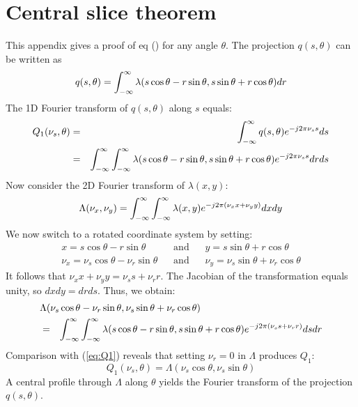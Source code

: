 \section{Central slice theorem \label{app:cs}}
This appendix gives a proof of eq () for any angle
$\theta$. The projection $q(s,\theta)$ can be written as
\begin{equation}
  q(s, \theta) = \int_{-\infty}^{\infty} \lambda(s \cos\theta - r\sin\theta, 
                                s \sin\theta + r\cos\theta) dr
\end{equation}
The 1D Fourier transform of $q(s,\theta)$ along $s$ equals:
\begin{eqnarray}
  Q_1(\nu_s, \theta) &=& \int_{-\infty}^{\infty} q(s, \theta) e^{-j2\pi \nu_s s} ds 
    \nonumber\\
  &=& \int_{-\infty}^{\infty}\int_{-\infty}^{\infty}\lambda(s\cos\theta - r\sin\theta, 
                          s\sin\theta + r\cos\theta)e^{-j2\pi \nu_s s} dr ds
      \label{eq:Q1}
\end{eqnarray}
Now consider the 2D Fourier transform of $\lambda(x,y)$:
\begin{equation}
  \Lambda(\nu_x, \nu_y) = \int_{-\infty}^{\infty} \int_{-\infty}^{\infty} \lambda(x,y) 
       e^{-j2\pi (\nu_x x + \nu_y y)} dx dy
\end{equation}
We now switch to a rotated coordinate system by setting:
\begin{eqnarray}
   x = s \cos\theta - r\sin\theta \;\;\;&\mbox{and}& \;\;\;
   y = s\sin\theta + r\cos\theta\\
   \nu_x = \nu_s \cos\theta - \nu_r\sin\theta \;\;\;&\mbox{and}& \;\;\;
   \nu_y = \nu_s\sin\theta + \nu_r\cos\theta
\end{eqnarray}
It follows that $\nu_x x + \nu_y y = \nu_s s + \nu_r r$. The Jacobian
of the transformation equals unity, so $dx dy = dr ds$. Thus, we obtain:
\begin{eqnarray}
\lefteqn{\Lambda(\nu_s \cos\theta - \nu_r\sin\theta, 
      \nu_s\sin\theta + \nu_r\cos\theta)} \nonumber\\
   &=& \intii \intii 
     \lambda(s \cos\theta - r\sin\theta, s\sin\theta + r\cos\theta) 
       e^{-j2\pi (\nu_s s + \nu_r r)} ds dr
\end{eqnarray}
Comparison with (\ref{eq:Q1}) reveals that setting $\nu_r = 0$ in
$\Lambda$ produces $Q_1$:
\begin{equation}
  Q_1(\nu_s, \theta) = \Lambda(\nu_s\cos\theta, \nu_s\sin\theta )
\end{equation}
A central profile through $\Lambda$ along $\theta$ yields the Fourier
transform of the projection $q(s,\theta)$.

